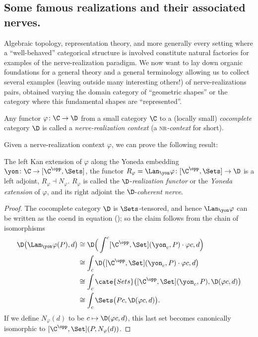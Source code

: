 \subsection{Some famous realizations and their associated nerves.}
Algebraic topology, representation theory, and more generally every setting where a ``well-behaved'' categorical structure is involved constitute natural factories for examples of the nerve\hyp{}realization paradigm. We now want to lay down organic foundations for a general theory and a general terminology allowing us to collect several examples (leaving outside many interesting others!) of nerve\hyp{}realizations pairs, obtained varying the domain category of ``geometric shapes'' or the category where this fundamental shapes are ``represented''. 
\begin{definition}\label{nr-para}
Any functor $\varphi\colon \C\to \D$ from a small category $\C$ to a (locally small) \emph{cocomplete} category $\D$ is called a \emph{nerve\hyp{}realization context} (a \textsc{nr}\emph{-context} for short).
\end{definition}
Given a nerve\hyp{}realization context $\varphi$, we can prove the following result:
\begin{proposition}\label{nervereal}
The left Kan extension of $\varphi$ along the Yoneda embedding $\yon \colon \C\to [\C^\opp, \Sets]$, \ie the functor $R_\varphi=\Lan_\yon \varphi\colon [\C^\opp, \Sets]\to \D$ is a left adjoint, $R_\varphi\dashv N_\varphi$. $R_\varphi$ is called the $\D$-\emph{realization functor} or the \emph{Yoneda extension} of $\varphi$, and its right adjoint the $\D$-\emph{coherent nerve}.
\end{proposition} 
\begin{proof}
The cocomplete category $\D$ is $\Sets$-tensored, and hence $\Lan_\yon \varphi$ can be written as the coend in equation (); so the claim follows from the chain of isomorphisms
\begin{align*}
\D\big( \Lan_\yon \varphi(P),d \big)&\cong \D\Big(\int^c [\C^\opp,\Set](\yon_c,P)\cdot \varphi c,d \Big)\\
&\cong \int_c\D\big( [\C^\opp,\Set](\yon_c,P)\cdot \varphi c,d \big)\\
&\cong \int_c\cate{Sets}\big( [\C^\opp,\Set](\yon_c,P),\D(\varphi c,d) \big)\\
&\cong \int_c\Sets\big(Pc, \D(\varphi c,d)\big).
\end{align*}
If we define $N_\varphi(d)$ to be $c\mapsto \D(\varphi c,d)$, this last set becomes canonically isomorphic to $[\C^\opp,\Set](P,N_\varphi(d))$.
\end{proof}
